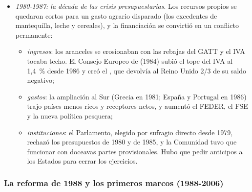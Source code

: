 \documentclass[11pt]{article}
\begin{document}
\begin{itemize}
\begin{itemize}
  \item \emph{instituciones}: los Tratados presupuestarios de Luxemburgo (1970) y de Bruselas (1975) dieron al Parlamento la última palabra sobre los «gastos no obligatorios» (todo lo que no era la PAC), el poder de rechazar el presupuesto en su conjunto y la aprobación de la gestión de la Comisión; el de 1975 creó el , que empezó a funcionar en 1977.
  \end{itemize}
\item \emph{1980-1987: la década de las crisis presupuestarias}. Los recursos propios se quedaron cortos para un gasto agrario disparado (los excedentes de mantequilla, leche y cereales), y la financiación se convirtió en un conflicto permanente:
  \begin{itemize}
  \item \emph{ingresos}: los aranceles se erosionaban con las rebajas del GATT y el IVA tocaba techo. El Consejo Europeo de  (1984) subió el tope del IVA al 1,4~\% desde 1986 y creó el , que devolvía al Reino Unido 2/3 de su saldo negativo;
  \item \emph{gastos}: la ampliación al Sur (Grecia en 1981; España y Portugal en 1986) trajo países menos ricos y receptores netos, y aumentó el FEDER, el FSE y la nueva política pesquera;
  \item \emph{instituciones}: el Parlamento, elegido por sufragio directo desde 1979, rechazó los presupuestos de 1980 y de 1985, y la Comunidad tuvo que funcionar con doceavas partes provisionales. Hubo que pedir anticipos a los Estados para cerrar los ejercicios.
  \end{itemize}
\end{itemize}

\subsubsection{La reforma de 1988 y los primeros marcos (1988-2006)}\label{sec:historia-delors}
\end{document}
